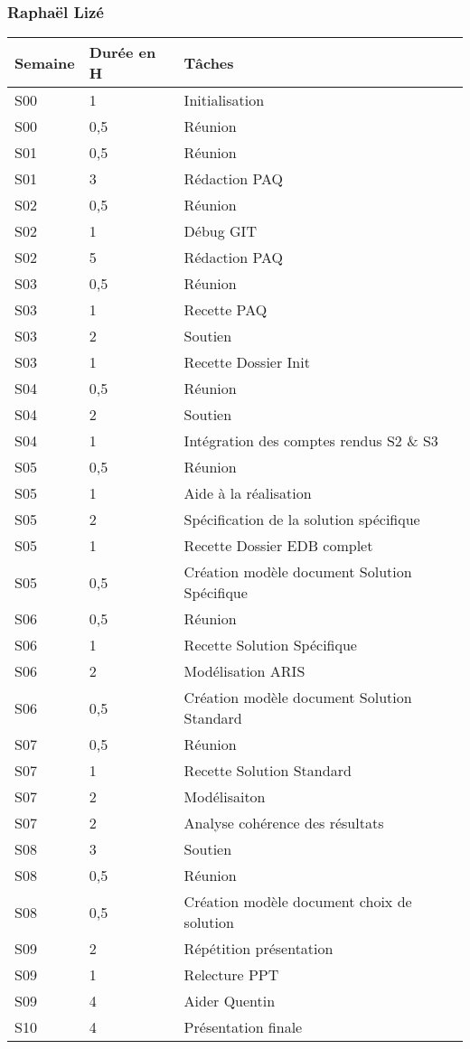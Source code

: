 \subsubsection{Raphaël Lizé}

\begin{tabular}{|l|l|l|}
\hline
Semaine&Durée en H&Tâches\\
\hline
S00&1&Initialisation\\
\hline
S00&0,5&Réunion\\
\hline
S01&0,5&Réunion\\
\hline
S01&3&Rédaction PAQ\\
\hline
S02&0,5&Réunion\\
\hline
S02&1&Débug GIT\\
\hline
S02&5&Rédaction PAQ\\
\hline
S03&0,5&Réunion\\
\hline
S03&1&Recette PAQ\\
\hline
S03&2&Soutien\\
\hline
S03&1&Recette Dossier Init\\
\hline
S04&0,5&Réunion\\
\hline
S04&2&Soutien\\
\hline
S04&1&Intégration des comptes rendus S2 \& S3\\
\hline
S05&0,5&Réunion\\
\hline
S05&1&Aide à la réalisation\\
\hline
S05&2&Spécification de la solution spécifique\\
\hline
S05&1&Recette Dossier EDB complet\\
\hline
S05&0,5&Création modèle document Solution Spécifique\\
\hline
S06&0,5&Réunion\\
\hline
S06&1&Recette Solution Spécifique\\
\hline
S06&2&Modélisation ARIS\\
\hline
S06&0,5&Création modèle document Solution Standard\\
\hline
S07&0,5&Réunion\\
\hline
S07&1&Recette Solution Standard\\
\hline
S07&2&Modélisaiton\\
\hline
S07&2&Analyse cohérence des résultats\\
\hline
S08&3&Soutien\\
\hline
S08&0,5&Réunion\\
\hline
S08&0,5&Création modèle document choix de solution\\
\hline
S09&2&Répétition présentation\\
\hline
S09&1&Relecture PPT\\
\hline
S09&4&Aider Quentin\\
\hline
S10&4&Présentation finale\\
\hline
\end{tabular}

